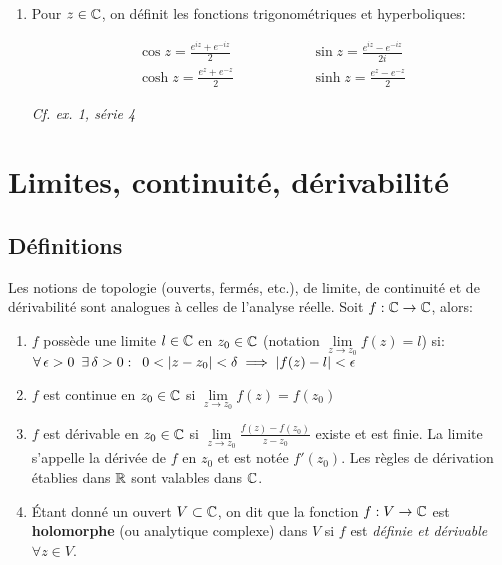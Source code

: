 \begin{example}
\begin{enumerate}[label=\arabic{enumi})]
    \item 
    Pour $z \in \mathbb{C}$, on définit les fonctions trigonométriques et hyperboliques:
    
    \begin{align*}
    \cos z = \frac{e^{iz} + e^{-iz}}{2}
    &\hspace{2cm} \sin z = \frac{e^{iz} - e^{-iz}}{2i}\\
    \cosh z = \frac{e^{z} + e^{-z}}{2}
    &\hspace{2cm} \sinh z = \frac{e^{z} - e^{-z}}{2}
    \end{align*}
    
    \textit{Cf. ex. 1, série 4}
\end{enumerate}
\end{example}


\section{Limites, continuité, dérivabilité}

\subsection{Définitions}

\begin{definition}
    Les notions de topologie (ouverts, fermés, etc.), de limite, de continuité et de dérivabilité sont analogues à celles de l'analyse réelle.
    Soit $f: \mathbb{C} \rightarrow \mathbb{C}$, alors:
    
    \begin{enumerate}[label=\arabic{enumi})]
    \item 
    $f$ possède une limite $l \in \mathbb{C}$ en $z_0 \in \mathbb{C}$ (notation $\lim\limits_{z \rightarrow z_0} f(z) = l$) si:\\
    $\forall\, \epsilon > 0 \enspace \exists\, \delta > 0 :\enspace 0 < \left|z - z_0\right| < \delta \implies \left|f(z) - l\right| < \epsilon$
    
    \item 
    $f$ est continue en $z_0 \in \mathbb{C}$ si $\lim\limits_{z \rightarrow z_0} f(z) = f(z_0)$
    
    \item 
    $f$ est dérivable en $z_0 \in \mathbb{C}$ si $\lim\limits_{z \rightarrow z_0} \frac{f(z) - f(z_0)}{z - z_0}$ existe et est finie.
    La limite s'appelle la dérivée de $f$ en $z_0$ et est notée $f'(z_0)$.
    Les règles de dérivation établies dans $\mathbb{R}$ sont valables dans $\mathbb{C}$.
    
    \item 
    Étant donné un ouvert $V \subset \mathbb{C}$, on dit que la fonction $f: V \rightarrow \mathbb{C}$ est \textbf{holomorphe} (ou analytique complexe) dans $V$ si $f$ est \textit{définie et dérivable} $\forall z \in V$.
    \end{enumerate}
\end{definition}

